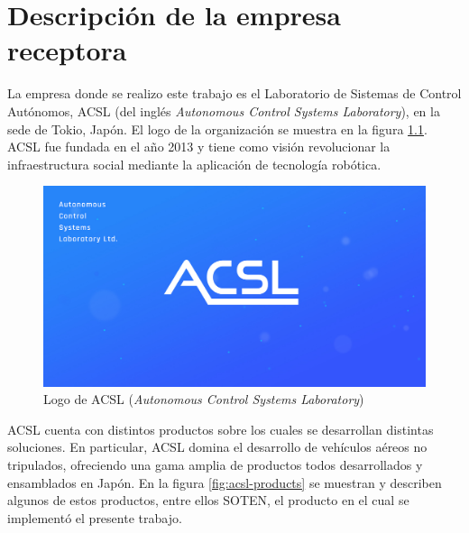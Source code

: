 \chapter{Descripción de la empresa receptora}
\label{capitulo2}

La empresa donde se realizo este trabajo es el Laboratorio de Sistemas de Control Autónomos, ACSL (del inglés \textit{Autonomous Control Systems Laboratory}), en la sede de Tokio, Japón. El logo de la organización se muestra en la figura \ref{fig:acsl-logo}. ACSL fue fundada en el año 2013 y tiene como visión revolucionar la infraestructura social mediante la aplicación de tecnología robótica.

\begin{figure}[H]
    \centering
    \includegraphics[scale=0.25]{partes/img/logo-acsl.jpg}
    \caption[Logo de ACSL (\textit{Autonomous Control Systems Laboratory})]{Logo de ACSL (\textit{Autonomous Control Systems Laboratory})}
    \label{fig:acsl-logo}
\end{figure}

ACSL cuenta con distintos productos sobre los cuales se desarrollan distintas soluciones. En particular, ACSL domina el desarrollo de vehículos aéreos no tripulados, ofreciendo una gama amplia de productos todos desarrollados y ensamblados en Japón. En la figura \ref{fig:acsl-products} se muestran y describen algunos de estos productos, entre ellos SOTEN, el producto en el cual se implementó el presente trabajo.

